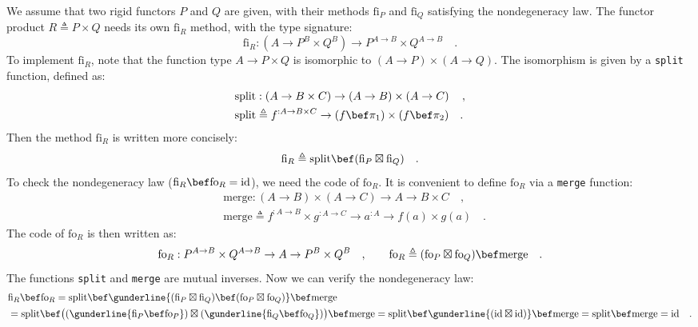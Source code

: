 We assume that two rigid functors $P$ and $Q$ are given, with their
methods $\text{fi}_{P}$ and $\text{fi}_{Q}$ satisfying the nondegeneracy
law. The functor product $R\triangleq P\times Q$ needs its own $\text{fi}_{R}$
method, with the type signature:
\[
\text{fi}_{R}:(A\rightarrow P^{B}\times Q^{B})\rightarrow P^{A\rightarrow B}\times Q^{A\rightarrow B}\quad.
\]
To implement $\text{fi}_{R}$, note that the function type $A\rightarrow P\times Q$
is isomorphic to $\left(A\rightarrow P\right)\times\left(A\rightarrow Q\right)$.
The isomorphism is given by a \lstinline!split! function, defined
as:
\begin{align*}
 & \text{split}:\left(A\rightarrow B\times C\right)\rightarrow\left(A\rightarrow B\right)\times\left(A\rightarrow C\right)\quad,\\
 & \text{split}\triangleq f^{:A\rightarrow B\times C}\rightarrow(f\bef\pi_{1})\times(f\bef\pi_{2})\quad.
\end{align*}
Then the method $\text{fi}_{R}$ is written more concisely:
\[
\text{fi}_{R}\triangleq\text{split}\bef(\text{fi}_{P}\boxtimes\text{fi}_{Q})\quad.
\]
To check the nondegeneracy law ($\text{fi}_{R}\bef\text{fo}_{R}=\text{id}$),
we need the code of $\text{fo}_{R}$. It is convenient to define $\text{fo}_{R}$
via a \lstinline!merge! function:
\begin{align*}
 & \text{merge}:\left(A\rightarrow B\right)\times\left(A\rightarrow C\right)\rightarrow A\rightarrow B\times C\quad,\\
 & \text{merge}\triangleq f^{:A\rightarrow B}\times g^{:A\rightarrow C}\rightarrow a^{:A}\rightarrow f(a)\times g(a)\quad.
\end{align*}
The code of $\text{fo}_{R}$ is then written as:
\[
\text{fo}_{R}:P^{A\rightarrow B}\times Q^{A\rightarrow B}\rightarrow A\rightarrow P^{B}\times Q^{B}\quad,\quad\quad\text{fo}_{R}\triangleq(\text{fo}_{P}\boxtimes\text{fo}_{Q})\bef\text{merge}\quad.
\]
The functions \lstinline!split! and \lstinline!merge! are mutual
inverses. Now we can verify the nondegeneracy law:
\begin{align*}
 & \text{fi}_{R}\bef\text{fo}_{R}=\text{split}\bef\gunderline{(\text{fi}_{P}\boxtimes\text{fi}_{Q})\bef(\text{fo}_{P}\boxtimes\text{fo}_{Q})}\bef\text{merge}\\
 & =\text{split}\bef\big((\gunderline{\text{fi}_{P}\bef\text{fo}_{P}})\boxtimes(\gunderline{\text{fi}_{Q}\bef\text{fo}_{Q}})\big)\bef\text{merge}=\text{split}\bef\gunderline{(\text{id}\boxtimes\text{id})}\bef\text{merge}=\text{split}\bef\text{merge}=\text{id}\quad.
\end{align*}


